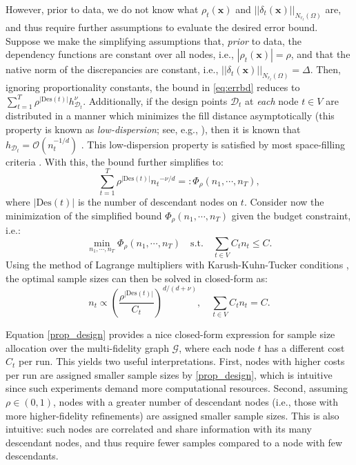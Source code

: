 \documentclass[12pt]{article}
\newcommand{\bs}[1]{\boldsymbol{#1}}
\begin{document}
However, prior to data, we do not know what $\rho_t(\bs{x})$ and $||\delta_t(\bs{x})||_{N_{r_t}(\Omega)}$ are, and thus require further assumptions to evaluate the desired error bound. Suppose we make the simplifying assumptions that, \textit{prior} to data, the dependency functions are constant over all nodes, i.e., $|\rho_t(\bs{x})| = \rho$, and that the native norm of the discrepancies are constant, i.e., $||\delta_t(\bs{x})||_{N_{r_t}(\Omega)} = \Delta$. Then, ignoring proportionality constants, the bound in \eqref{eq:errbd} reduces to $\sum_{t=1}^T \rho^{|\text{Des}(t)|} h_{\mathcal{D}_t}^{\nu}$. Additionally, if the design points $\mathcal{D}_t$ at \textit{each} node $t \in V$ are distributed in a manner which minimizes the fill distance asymptotically (this property is known as \textit{low-dispersion}; see, e.g., \citealp{fang1993number}), then it is known that $h_{\mathcal{D}_t} = \mathcal{O}(n_t^{-1/d})$ \citep{wendland2004scattered}. This low-dispersion property is satisfied by most space-filling criteria \citep{mMMm2017}. With this, the bound further simplifies to:
\begin{equation}
\sum_{t=1}^T \rho^{|\text{Des}(t)|} {n_t}^{-\nu/d} =: \Phi_\rho(n_1, \cdots, n_T),
\end{equation}
where $|\text{Des}(t)|$ is the number of descendant nodes on $t$. Consider now the minimization of the simplified bound $\Phi_\rho(n_1, \cdots, n_T)$ given the budget constraint, i.e.:
\begin{equation}
\min_{n_1, \cdots, n_T} \Phi_\rho(n_1, \cdots, n_T) \quad \text{s.t.} \quad \sum_{t \in V} C_t n_t \leq C.
\label{eq:sampleopt}
\end{equation}
Using the method of Lagrange multipliers with Karush-Kuhn-Tucker conditions \citep{nocedal2006numerical}, the optimal sample sizes can then be solved in closed-form as:
\begin{equation}\label{prop_design}
    n_t \propto \left(\frac{\rho^{|\text{Des}(t)|}}{C_t}\right)^{d/(d+\nu)}, \quad \sum_{t \in V} C_t n_t = C.
\end{equation}

Equation \eqref{prop_design} provides a nice closed-form expression for sample size allocation over the multi-fidelity graph $\mathcal{G}$, where each node $t$ has a different cost $C_t$ per run. This yields two useful interpretations. First, nodes with higher costs per run are assigned smaller sample sizes by \eqref{prop_design}, which is intuitive since such experiments demand more computational resources. Second, assuming $\rho \in (0,1)$, nodes with a greater number of descendant nodes (i.e., those with more higher-fidelity refinements) are assigned smaller sample sizes. This is also intuitive: such nodes are correlated and share information with its many descendant nodes, and thus require fewer samples compared to a node with few descendants.
\end{document}
